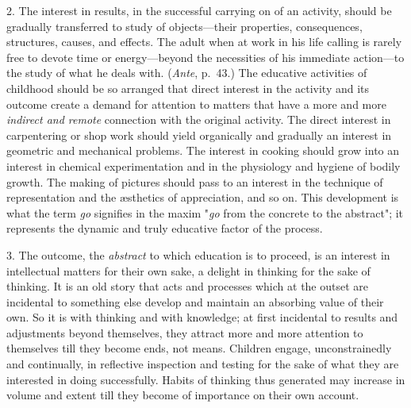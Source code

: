 \documentclass[letterpaper]{book}
\begin{document}

2. The interest in results, in the successful carrying on of an
activity, should be gradually transferred to
study
of objects---their properties, consequences, structures, causes, and
effects. The adult when at work in his life calling is rarely free to
devote time or energy---beyond the necessities of his immediate
action---to the study of what he deals with. (\emph{Ante}, p.\ 43.) The
educative activities of childhood should be so arranged that direct
interest in the activity and its outcome create a demand for attention
to matters that have a more and more \emph{indirect and remote}
connection with the original activity. The direct interest in
carpentering or shop work should yield organically and gradually an
interest in geometric and mechanical problems. The interest in cooking
should grow into an interest in chemical experimentation and in the
physiology and hygiene of bodily growth. The making of pictures should
pass to an interest in the technique of representation and the æsthetics
of appreciation, and so on. This development is what the term \emph{go}
signifies in the maxim "\emph{go} from the concrete to the abstract"; it
represents the dynamic and truly educative factor of the process.


3. The outcome, the \emph{abstract} to which education is to proceed, is
an interest in intellectual matters for their own sake, a delight in
thinking for the sake of thinking. It is an old story that acts and
processes which at the outset are incidental to something else develop
and maintain an absorbing value of their own. So it is with thinking and
with knowledge; at first incidental to results and adjustments beyond
themselves, they attract more and more attention to themselves till they
become ends, not means. Children engage, unconstrainedly and
continually, in reflective inspection and testing for the sake of what
they are interested in doing successfully. Habits of thinking thus
generated may increase in
volume
and extent till they become of importance on their own account.

\end{document}
